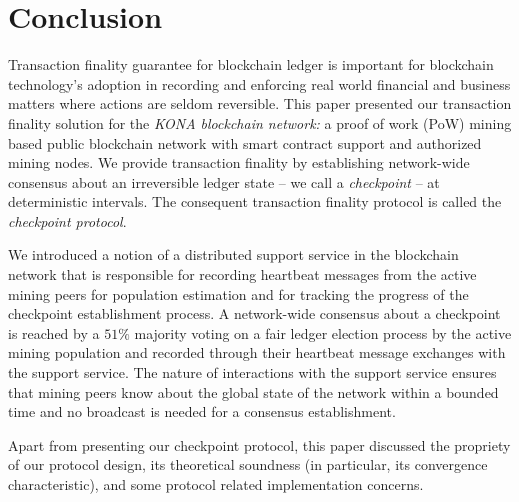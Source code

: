 \documentclass[conference]{IEEEtran}
\begin{document}




    



    
        




\section{Conclusion}
\label{s-conclusion}
Transaction finality guarantee for blockchain ledger is important for blockchain technology's adoption in recording and enforcing real world financial and business matters where actions are seldom reversible. This paper presented our transaction finality solution for the \textit{KONA blockchain network:} a proof of work (PoW) mining based public blockchain network with smart contract support and authorized mining nodes. We provide transaction finality by establishing network-wide consensus about an irreversible ledger state -- we call a \textit{checkpoint} -- at deterministic intervals. The consequent transaction finality protocol is called the \textit{checkpoint protocol}.   

We introduced a notion of a distributed support service in the blockchain network that is responsible for recording heartbeat messages from the active mining peers for population estimation and for tracking the progress of the checkpoint establishment process. A network-wide consensus about a checkpoint is reached by a $51\%$ majority voting on a fair ledger election process by the active mining population and recorded through their heartbeat message exchanges with the support service. The nature of interactions with the support service ensures that mining peers know about the global state of the network within a bounded time and no broadcast is needed for a consensus establishment. 

Apart from presenting our checkpoint protocol, this paper discussed the propriety of our protocol design, its theoretical soundness (in particular, its convergence characteristic), and some protocol related implementation concerns.
      
\end{document}
